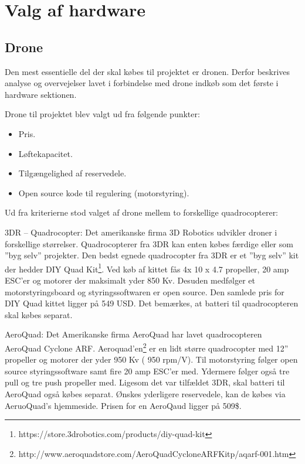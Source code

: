 \chapter{Valg af hardware}

\section{Drone}

Den mest essentielle del der skal købes til projektet er dronen. Derfor beskrives analyse og overvejelser lavet i forbindelse med drone indkøb som det første i hardware sektionen. 
  
Drone til projektet blev valgt ud fra følgende punkter:
\begin{itemize}
	\item Pris.
	\item Løftekapacitet. 
	\item Tilgængelighed af reservedele. 
	\item Open source kode til regulering (motorstyring).
\end{itemize}

\vspace{0.5cm}

Ud fra kriterierne stod valget af drone mellem to forskellige quadrocopterer: 

3DR – Quadrocopter:  Det amerikanske firma 3D Robotics udvikler droner i forskellige størrelser. Quadrocopterer fra 3DR kan enten købes færdige eller som ”byg selv” projekter. Den bedst egnede quadrocopter fra 3DR er et ”byg selv” kit der hedder DIY Quad Kit\footnote{https://store.3drobotics.com/products/diy-quad-kit}. Ved køb af kittet fås 4x 10 x 4.7 propeller, 20 amp ESC’er og motorer der maksimalt yder 850 Kv.  Desuden medfølger et motorstyringsboard og styringssoftwaren er open source. Den samlede pris for DIY Quad kittet ligger på 549 USD. Det bemærkes, at batteri til quadrocopteren skal købes separat.

AeroQuad: Det Amerikanske firma AeroQuad har lavet quadrocopteren AeroQuad Cyclone ARF. Aeroquad'en\footnote{http://www.aeroquadstore.com/AeroQuad\textunderscore Cyclone\textunderscore ARF\textunderscore Kit\textunderscore p/aqarf-001.htm} er en lidt større quadrocopter med 12” propeller og motorer der yder 950 Kv ( 950 rpm/V). Til motorstyring følger open source styringssoftware samt fire 20 amp ESC'er med. Ydermere følger også tre pull og tre push propeller med. \newline Ligesom det var tilfældet 3DR, skal batteri til AeroQuad også købes separat. Ønskes yderligere reservedele, kan de købes via AeruoQuad’s hjemmeside. Prisen for en AeroQaud ligger på 509\$.

